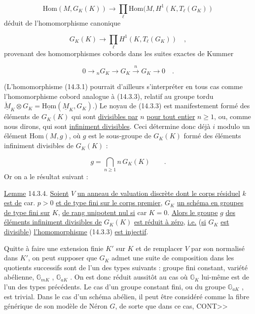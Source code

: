 \begin{equation}\tag{14.3.2}
\mathrm{Hom}(M, G_K(K)) \longrightarrow \prod_\ell \mathrm{Hom}(M, H^1(K, T_\ell(G_K))
\end{equation}
déduit de l'homomorphisme canonique

\begin{equation}\tag{14.3.3}
G_K(K) \longrightarrow \prod_\ell H^1(K, T_\ell(G_K)) \quad ,
\end{equation}
provenant des homomorphismes cobords dans les suites exactes de Kummer

\begin{equation*}
0 \longrightarrow {}_n G_K \longrightarrow G_K \xrightarrow{\; n \;} G_K \longrightarrow 0 \quad .
\end{equation*}


(L'homomorphisme (14.3.1) pourrait d'ailleurs s'interpréter en tous cas comme l'homomorphisme cobord analogue à (14.3.3), relatif au groupe tordu $\check{\underline{M}}_K \otimes G_K = \underline{\mathrm{Hom}}(\underline{M}_K , G_K)$.) Le noyau de (14.3.3) est manifestement formé des éléments de $G_K(K)$ qui sont \underline{divisibles par} $n$ \underline{pour tout entier} $n \geq 1$, ou, comme nous dirons, qui sont \underline{infiniment divisibles}. Ceci détermine donc déjà $i$ modulo un élément $\mathrm{Hom}(M,g)$, où $g$ est le sous-groupe de $G_K(K)$ formé des éléments infiniment divisibles de $G_K(K)$ :

\begin{equation*}
g = \bigcap_{n \geq 1} n\, G_K(K) \qquad .
\end{equation*}
Or on a le résultat suivant :

\underline{Lemme} 14.3.4. \underline{Soient} $V$ \underline{un anneau de valuation discrète dont le corps résiduel} $k$ \underline{est de} car. $p > 0$ \underline{et de type fini sur le corps premier}, $G_K$ \underline{un schéma en groupes de type fini sur} $K$, \underline{de rang unipotent nul si} car $K = 0$. \underline{Alors le groupe} $g$ \underline{des éléments infiniment divisibles de} $G_K(K)$ \underline{est réduit à zéro}, \underline{i.e.} (\underline{si} $G_K$ \underline{est divisible}) \underline{l'homomorphisme} (14.3.3) \underline{est injectif}.

Quitte à faire une extension finie $K'$ sur $K$ et de remplacer $V$ par son normalisé dans $K'$, on peut supposer que $G_K$ admet une suite de composition dans les quotients successifs sont de l'un des types suivants : groupe fini constant, variété abélienne, $\mathbb{G}_{mK}$ , $\mathbb{G}_{aK}$ . On est donc réduit aussitôt au cas où $\mathbb{G}_K$ lui-même est de l'un des types précédents. Le cas d'un groupe constant fini, ou du groupe $\mathbb{G}_{aK}$ , est trivial. Dans le cas d'un schéma abélien, il peut être considéré comme la fibre générique de son modèle de Néron $G$, de sorte que dans ce cas, CONT>>


